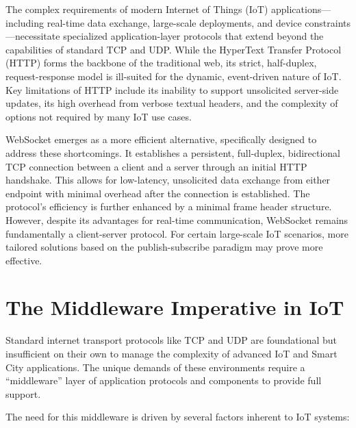 \documentclass[a4paper, 12pt]{book} %
\begin{document}
The complex requirements of modern Internet of Things (IoT)
applications---including real-time data exchange, large-scale
deployments, and device constraints---necessitate specialized
application-layer protocols that extend beyond the capabilities of
standard TCP and UDP. While the HyperText Transfer Protocol (HTTP) forms
the backbone of the traditional web, its strict, half-duplex,
request-response model is ill-suited for the dynamic, event-driven
nature of IoT. Key limitations of HTTP include its inability to support
unsolicited server-side updates, its high overhead from verbose textual
headers, and the complexity of options not required by many IoT use
cases.

WebSocket emerges as a more efficient alternative, specifically designed
to address these shortcomings. It establishes a persistent, full-duplex,
bidirectional TCP connection between a client and a server through an
initial HTTP handshake. This allows for low-latency, unsolicited data
exchange from either endpoint with minimal overhead after the connection
is established. The protocol's efficiency is further enhanced by a
minimal frame header structure. However, despite its advantages for
real-time communication, WebSocket remains fundamentally a client-server
protocol. For certain large-scale IoT scenarios, more tailored solutions
based on the publish-subscribe paradigm may prove more effective.

\section{The Middleware Imperative in
IoT}\label{the-middleware-imperative-in-iot}

Standard internet transport protocols like TCP and UDP are foundational
but insufficient on their own to manage the complexity of advanced IoT
and Smart City applications. The unique demands of these environments
require a ``middleware'' layer of application protocols and components
to provide full support.

The need for this middleware is driven by several factors inherent to
IoT systems:
\end{document}
